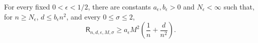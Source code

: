 For every fixed \(0<\epsilon<1/2\), there are constants \(a_{\epsilon},b_{\epsilon}>0\) and \(N_{\epsilon}<\infty\) such that, for \(n\ge N_{\epsilon}\), \(d\le b_{\epsilon}n^2\), and every \(0\le\sigma\le2\),
\[
 \mathsf R_{n,d,\epsilon,M,\sigma}
 \ge a_{\epsilon}M^2\left(\frac1n+\frac d{n^2}\right).
\]